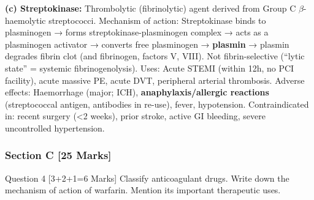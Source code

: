 \documentclass[11pt,a4paper]{article}
\begin{document}
\begin{ansbox}
\textbf{(c) Streptokinase:}
Thrombolytic (fibrinolytic) agent derived from Group C $\beta$-haemolytic streptococci. Mechanism of action: Streptokinase binds to plasminogen → forms streptokinase-plasminogen complex → acts as a plasminogen activator → converts free plasminogen → \textbf{plasmin} → plasmin degrades fibrin clot (and fibrinogen, factors V, VIII). Not fibrin-selective (``lytic state'' = systemic fibrinogenolysis). Uses: Acute STEMI (within 12h, no PCI facility), acute massive PE, acute DVT, peripheral arterial thrombosis. Adverse effects: Haemorrhage (major; ICH), \textbf{anaphylaxis/allergic reactions} (streptococcal antigen, antibodies in re-use), fever, hypotension. Contraindicated in: recent surgery (\textless{}2 weeks), prior stroke, active GI bleeding, severe uncontrolled hypertension.
\end{ansbox}

\subsubsection{Section C [25 Marks]}

\begin{qbox}{Question 4 [3+2+1=6 Marks]}
Classify anticoagulant drugs. Write down the mechanism of action of warfarin. Mention its important therapeutic uses.
\end{qbox}
\end{document}
